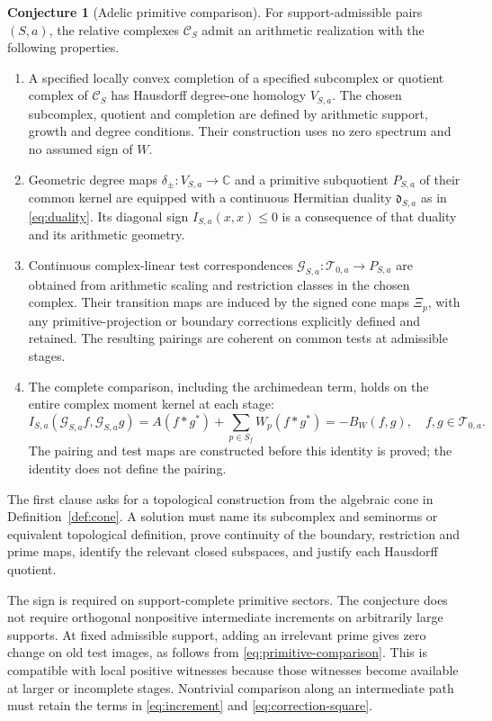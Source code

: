 \documentclass[11pt,letterpaper]{article}
\theoremstyle{definition}
\newtheorem{conjecture}[theorem]{Conjecture}
\theoremstyle{remark}
\newcommand{\C}{\mathbb C}
\newcommand{\T}{\mathcal T}
\begin{document}
\begin{conjecture}[Adelic primitive comparison]\label{conj:primitive}
For support-admissible pairs $(S,a)$, the relative complexes
$\mathscr C_S$ admit an arithmetic realization with the following
properties.
\begin{enumerate}
 \item A specified locally convex completion of a specified
 subcomplex or quotient complex of $\mathscr C_S$ has Hausdorff
 degree-one homology $V_{S,a}$. The chosen subcomplex, quotient
 and completion are defined by arithmetic support, growth and
 degree conditions. Their construction uses no zero spectrum
 and no assumed sign of $W$.
 \item Geometric degree maps $\delta_\pm:V_{S,a}\to\C$ and a
 primitive subquotient $P_{S,a}$ of their common kernel are
 equipped with a continuous Hermitian duality
 $\mathfrak d_{S,a}$ as in \eqref{eq:duality}. Its diagonal sign
 $I_{S,a}(x,x)\le0$ is a consequence of that duality and its
 arithmetic geometry.
 \item Continuous complex-linear test correspondences
 $\mathcal G_{S,a}:\T_{0,a}\to P_{S,a}$ are obtained from
 arithmetic scaling and restriction classes in the chosen
 complex. Their transition maps are induced by the signed cone
 maps $\Xi_p$, with any primitive-projection or boundary
 corrections explicitly defined and retained. The resulting
 pairings are coherent on common tests at admissible stages.
 \item The complete comparison, including the archimedean
 term, holds on the entire complex moment kernel at each stage:
 \begin{equation}
 I_{S,a}(\mathcal G_{S,a}f,\mathcal G_{S,a}g)
       =A(f*g^*)+\sum_{p\in S_f}W_p(f*g^*)
       =-B_W(f,g),\quad f,g\in\T_{0,a}.
 \label{eq:primitive-comparison}
 \end{equation}
 The pairing and test maps are constructed before this identity
 is proved; the identity does not define the pairing.
\end{enumerate}
\end{conjecture}

The first clause asks for a topological construction from the
algebraic cone in Definition~\ref{def:cone}. A solution must name
its subcomplex and seminorms or equivalent topological definition,
prove continuity of the boundary, restriction and prime maps,
identify the relevant closed subspaces, and justify each
Hausdorff quotient.

The sign is required on support-complete primitive sectors.
The conjecture does not require orthogonal nonpositive
intermediate increments on arbitrarily large supports.
At fixed admissible support, adding an irrelevant prime gives
zero change on old test images, as follows from
\eqref{eq:primitive-comparison}. This is compatible with local
positive witnesses because those witnesses become available at
larger or incomplete stages. Nontrivial comparison along an
intermediate path must retain the terms in
\eqref{eq:increment} and \eqref{eq:correction-square}.
\end{document}
